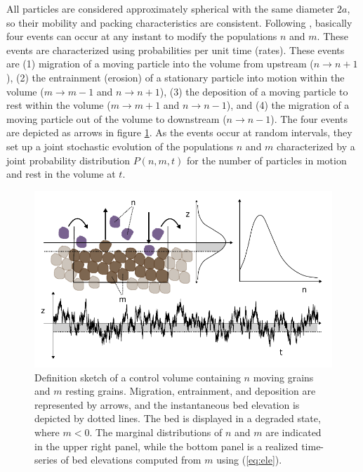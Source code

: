 All particles are considered approximately spherical with the same diameter $2a$, so their mobility and packing characteristics are consistent.
Following \citet{Ancey2008}, basically four events can occur at any instant to modify the populations $n$ and $m$. These events are characterized using probabilities per unit time (rates).
These events are (1) migration of a moving particle into the volume from upstream ($n \rightarrow n+1$), (2) the entrainment (erosion) of a stationary particle into motion within the volume ($m\rightarrow m-1$ and $n\rightarrow n+1$), (3) the deposition of a moving particle to rest within the volume ($m\rightarrow m+1$ and $n\rightarrow n-1$), and (4) the migration of a moving particle out of the volume to downstream ($n\rightarrow n-1$).
The four events are depicted as arrows in figure \ref{fig:eledefinition}.
As the events occur at random intervals, they set up a joint stochastic evolution of the populations $n$ and $m$ characterized by a joint probability distribution $P(n,m,t)$ for the number of particles in motion and rest in the volume at $t$.
\begin{figure}[!htbp]
	\includegraphics[width=\linewidth,keepaspectratio]{./figures/ch3/definition-combo.pdf}
	\caption{Definition sketch of a control volume containing $n$ moving grains and $m$ resting grains. Migration, entrainment, and deposition are represented by arrows, and the instantaneous bed elevation is depicted by dotted lines. The bed is displayed in a degraded state, where $m<0$. The marginal distributions of $n$ and $m$ are indicated in the upper right panel, while the bottom panel is a realized time-series of bed elevations computed from $m$ using (\ref{eq:ele}).}
	\label{fig:eledefinition}
\end{figure}

